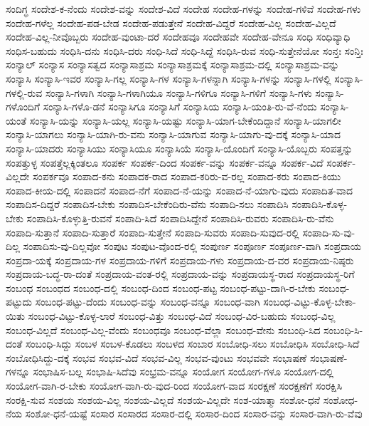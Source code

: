 {ಸಂದಿಗ್ಧ
ಸಂದೇಶ-ಕ-ನೆಂದು
ಸಂದೇಶ-ವನ್ನು
ಸಂದೇಶ-ವಿದೆ
ಸಂದೇಹ
ಸಂದೇಹ-ಗಳನ್ನು
ಸಂದೇಹ-ಗಳಿವೆ
ಸಂದೇಹ-ಗಳು
ಸಂದೇಹ-ಗಳೆಲ್ಲ
ಸಂದೇಹ-ಪಡ-ಬೇಡ
ಸಂದೇಹ-ಪಡುತ್ತೇನೆ
ಸಂದೇಹ-ವಿದ್ದರೆ
ಸಂದೇಹ-ವಿಲ್ಲ
ಸಂದೇಹ-ವಿಲ್ಲದೆ
ಸಂದೇಹ-ವಿಲ್ಲ-ನೀವೊಬ್ಬರು
ಸಂದೇಹ-ವುಂಟಾ-ದರೆ
ಸಂದೇಹವೂ
ಸಂದೇಹವೇ
ಸಂದೇಹ-ವೇನೂ
ಸಂಧಿ
ಸಂಧಿವ್ಯಾಧಿ
ಸಂಧಿಸ-ಬಹುದು
ಸಂಧಿಸಿ-ದನು
ಸಂಧಿಸಿ-ದರು
ಸಂಧಿ-ಸಿದೆ
ಸಂಧಿ-ಸಿದ್ದೆ
ಸಂಧಿಸಿ-ರುವ
ಸಂಧಿ-ಸುತ್ತೇನೆಯೋ
ಸಂನ್ತಃ
ಸಂನ್ತಿಃ
ಸಂನ್ಯಾಲ್
ಸಂನ್ಯಾಸ
ಸಂನ್ಯಾಸತ್ವದ
ಸಂನ್ಯಾಸಾಶ್ರಮ
ಸಂನ್ಯಾಸಾಶ್ರಮಕ್ಕೆ
ಸಂನ್ಯಾಸಾಶ್ರಮ-ದಲ್ಲಿ
ಸಂನ್ಯಾಸಾಶ್ರಮ-ವನ್ನು
ಸಂನ್ಯಾಸಿ
ಸಂನ್ಯಾಸಿ-ಇವರ
ಸಂನ್ಯಾಸಿ-ಗಲ್ಲ
ಸಂನ್ಯಾಸಿ-ಗಳ
ಸಂನ್ಯಾಸಿ-ಗಳನ್ನಾಗಿ
ಸಂನ್ಯಾಸಿ-ಗಳನ್ನು
ಸಂನ್ಯಾಸಿ-ಗಳಲ್ಲಿ
ಸಂನ್ಯಾಸಿ-ಗಳಲ್ಲಿ-ರುವ
ಸಂನ್ಯಾಸಿ-ಗಳಾಗಿ
ಸಂನ್ಯಾಸಿ-ಗಳಾಗಿಯೂ
ಸಂನ್ಯಾಸಿ-ಗಳಿಗೂ
ಸಂನ್ಯಾಸಿ-ಗಳಿಗೆ
ಸಂನ್ಯಾಸಿ-ಗಳು
ಸಂನ್ಯಾಸಿ-ಗಳೊಂದಿಗೆ
ಸಂನ್ಯಾಸಿ-ಗಳೊ-ಡನೆ
ಸಂನ್ಯಾಸಿಗೂ
ಸಂನ್ಯಾಸಿಗೆ
ಸಂನ್ಯಾಸಿಯ
ಸಂನ್ಯಾಸಿ-ಯಂತಿ-ರು-ವೆ-ನೆಂದು
ಸಂನ್ಯಾಸಿ-ಯಂತೆ
ಸಂನ್ಯಾಸಿ-ಯನ್ನು
ಸಂನ್ಯಾಸಿ-ಯಲ್ಲ
ಸಂನ್ಯಾಸಿ-ಯಷ್ಟು
ಸಂನ್ಯಾಸಿ-ಯಾಗ-ಬೇಕೆಂದಿದ್ದಾನೆ
ಸಂನ್ಯಾಸಿ-ಯಾಗಲೀ
ಸಂನ್ಯಾಸಿ-ಯಾಗಲು
ಸಂನ್ಯಾಸಿ-ಯಾಗಿ-ರು-ವನು
ಸಂನ್ಯಾಸಿ-ಯಾಗುವ
ಸಂನ್ಯಾಸಿ-ಯಾಗು-ವು-ದಕ್ಕೆ
ಸಂನ್ಯಾಸಿ-ಯಾದ
ಸಂನ್ಯಾಸಿ-ಯಾದರು
ಸಂನ್ಯಾಸಿಯು
ಸಂನ್ಯಾಸಿಯೂ
ಸಂನ್ಯಾಸಿಯೆ
ಸಂನ್ಯಾಸಿ-ಯೊಂದಿಗೆ
ಸಂನ್ಯಾಸಿ-ಯೊಬ್ಬರು
ಸಂಪತ್ತನ್ನು
ಸಂಪತ್ತುಳ್ಳ
ಸಂಪತ್ತೆಲ್ಲಕ್ಕಿಂತಲೂ
ಸಂಪರ್ಕ
ಸಂಪರ್ಕ-ದಿಂದ
ಸಂಪರ್ಕ-ವನ್ನು
ಸಂಪರ್ಕ-ವನ್ನೂ
ಸಂಪರ್ಕ-ವಿದೆ
ಸಂಪರ್ಕ-ವಿಲ್ಲದೇ
ಸಂಪರ್ಕವೂ
ಸಂಪಾದ-ಕನು
ಸಂಪಾದಕ-ರಾದ
ಸಂಪಾದ-ಕರಿರು-ವ-ರಲ್ಲ
ಸಂಪಾದ-ಕರು
ಸಂಪಾದ-ಕಿಯು
ಸಂಪಾದ-ಕೀಯ-ದಲ್ಲಿ
ಸಂಪಾದನೆ
ಸಂಪಾದ-ನೆಗೆ
ಸಂಪಾದ-ನೆ-ಯನ್ನು
ಸಂಪಾದ-ನೆ-ಯಾಗು-ವುದು
ಸಂಪಾದಿತ-ವಾದ
ಸಂಪಾದಿಸ-ದಿದ್ದರೆ
ಸಂಪಾದಿಸ-ಬೇಕು
ಸಂಪಾದಿಸ-ಬೇಕೆಂದಿರು-ವೆನು
ಸಂಪಾದಿ-ಸಲು
ಸಂಪಾದಿಸಿ
ಸಂಪಾದಿಸಿ-ಕೊಳ್ಳ-ಬೇಕು
ಸಂಪಾದಿಸಿ-ಕೊಳ್ಳುತ್ತಿ-ರುವನೆ
ಸಂಪಾದಿ-ಸಿದೆ
ಸಂಪಾದಿಸಿದ್ದೇನೆ
ಸಂಪಾದಿಸಿ-ರುವರು
ಸಂಪಾದಿಸಿ-ರು-ವೆನು
ಸಂಪಾದಿ-ಸುತ್ತಾನೆ
ಸಂಪಾದಿ-ಸುತ್ತಾರೆ
ಸಂಪಾದಿ-ಸುತ್ತೇನೆ
ಸಂಪಾದಿ-ಸುವರು
ಸಂಪಾದಿ-ಸುವುದ-ರಲ್ಲಿ
ಸಂಪಾದಿ-ಸು-ವು-ದಿಲ್ಲ
ಸಂಪಾದಿಸು-ವು-ದಿಲ್ಲವೋ
ಸಂಪುಟ
ಸಂಪುಟ-ವೊಂದ-ರಲ್ಲಿ
ಸಂಪುರ್ಣ
ಸಂಪೂರ್ಣ
ಸಂಪೂರ್ಣ-ವಾಗಿ
ಸಂಪ್ರದಾಯ
ಸಂಪ್ರದಾ-ಯಕ್ಕೆ
ಸಂಪ್ರದಾಯ-ಗಳ
ಸಂಪ್ರದಾಯ-ಗಳಿಗೆ
ಸಂಪ್ರದಾಯ-ಗಳು
ಸಂಪ್ರದಾಯ-ದ-ವರ
ಸಂಪ್ರದಾಯ-ನಿಷ್ಠರು
ಸಂಪ್ರದಾಯ-ಬದ್ಧ-ರಾ-ದಂತೆ
ಸಂಪ್ರದಾಯ-ವಂತ-ರಲ್ಲಿ
ಸಂಪ್ರದಾಯ-ವನ್ನು
ಸಂಪ್ರದಾಯಸ್ಥ-ರಾದ
ಸಂಪ್ರದಾಯಸ್ಥ-ರಿಗೆ
ಸಂಬಂಧ
ಸಂಬಂಧದ
ಸಂಬಂಧ-ದಲ್ಲಿ
ಸಂಬಂಧ-ದಿಂದ
ಸಂಬಂಧ-ಪಟ್ಟ
ಸಂಬಂಧ-ಪಟ್ಟು-ದಾಗಿ-ರ-ಬೇಕು
ಸಂಬಂಧ-ಪಟ್ಟುದು
ಸಂಬಂಧ-ಪಟ್ಟು-ದೆಂದು
ಸಂಬಂಧ-ವನ್ನು
ಸಂಬಂಧ-ವನ್ನೂ
ಸಂಬಂಧ-ವಾಗಿ
ಸಂಬಂಧ-ವಿಟ್ಟು-ಕೊಳ್ಳ-ಬೇಕಾ-ಯಿತು
ಸಂಬಂಧ-ವಿಟ್ಟು-ಕೊಳ್ಳ-ಲಾರೆ
ಸಂಬಂಧ-ವಿತ್ತು
ಸಂಬಂಧ-ವಿದೆ
ಸಂಬಂಧ-ವಿರ-ಬಹುದು
ಸಂಬಂಧ-ವಿಲ್ಲ
ಸಂಬಂಧ-ವಿಲ್ಲದೆ
ಸಂಬಂಧ-ವಿಲ್ಲ-ವೆಂದು
ಸಂಬಂಧವೂ
ಸಂಬಂಧ-ವೆಲ್ಲಾ
ಸಂಬಂಧ-ವೇನು
ಸಂಬಂಧಿ-ಸಿದ
ಸಂಬಂಧಿ-ಸಿ-ದಂತೆ
ಸಂಬಂಧಿ-ಸಿದ್ದು
ಸಂಬಳ
ಸಂಬಳ-ಕೊಡಲು
ಸಂಬಳದ
ಸಂಬಾರ
ಸಂಬೋಧಿ-ಸಲು
ಸಂಬೋಧಿಸಿ
ಸಂಬೋಧಿ-ಸಿದೆ
ಸಂಬೋಧಿಸಿದ್ದು-ದಕ್ಕೆ
ಸಂಭವ
ಸಂಭವ-ವಿದೆ
ಸಂಭವ-ವಿಲ್ಲ
ಸಂಭವ-ವುಂಟು
ಸಂಭವವೇ
ಸಂಭಾಷಣೆ
ಸಂಭಾಷಣೆ-ಗಳನ್ನೂ
ಸಂಭಾಷಿಸ-ಬಲ್ಲ
ಸಂಭಾಷಿ-ಸಿದೆವು
ಸಂಭ್ರಮ-ವನ್ನೂ
ಸಂಯೋಗ
ಸಂಯೋಗ-ಗಳೂ
ಸಂಯೋಗ-ದಲ್ಲಿ
ಸಂಯೋಗ-ವಾಗಿ-ರ-ಬೇಕು
ಸಂಯೋಗ-ವಾಗಿ-ರು-ವುದ-ರಿಂದ
ಸಂಯೋಗ-ವಾದ
ಸಂರಕ್ಷಣೆ
ಸಂರಕ್ಷಣೆಗೆ
ಸಂರಕ್ಷಿಸಿ
ಸಂರಕ್ಷಿ-ಸುವ
ಸಂಶಯ
ಸಂಶಯ-ವಿಲ್ಲ
ಸಂಶಯ-ವಿಲ್ಲದೆ
ಸಂಶಯ-ವಿಲ್ಲದೇ
ಸಂಶ-ಯಾತ್ಮಾ
ಸಂಶೋ-ಧನೆ
ಸಂಶೋಧ-ನೆಯ
ಸಂಶೋ-ಧನೆ-ಯಷ್ಟೆ
ಸಂಸಾರ
ಸಂಸಾರದ
ಸಂಸಾರ-ದಲ್ಲಿ
ಸಂಸಾರ-ದಿಂದ
ಸಂಸಾರ-ವನ್ನು
ಸಂಸಾರ-ವಾಗಿ-ರು-ವೆವು
}
